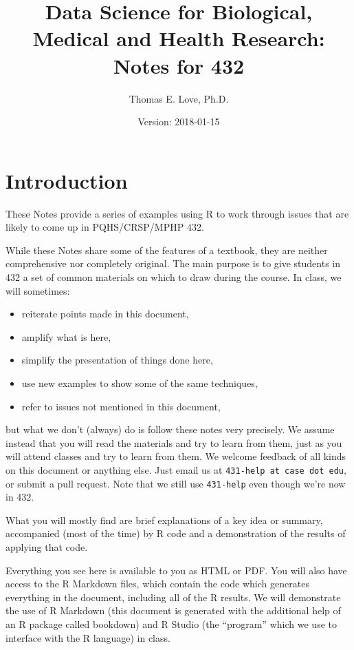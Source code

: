 \documentclass[]{book}
\title{Data Science for Biological, Medical and Health Research: Notes for 432}
\author{Thomas E. Love, Ph.D.}
\date{Version: 2018-01-15}
\providecommand{\tightlist}{%
  \setlength{\itemsep}{0pt}\setlength{\parskip}{0pt}}
\theoremstyle{definition}
\theoremstyle{definition}
\theoremstyle{definition}
\theoremstyle{remark}
\begin{document}
\maketitle

{
\setcounter{tocdepth}{1}
\tableofcontents
}
\chapter*{Introduction}\label{introduction}

These Notes provide a series of examples using R to work through issues
that are likely to come up in PQHS/CRSP/MPHP 432.

While these Notes share some of the features of a textbook, they are
neither comprehensive nor completely original. The main purpose is to
give students in 432 a set of common materials on which to draw during
the course. In class, we will sometimes:

\begin{itemize}
\tightlist
\item
  reiterate points made in this document,
\item
  amplify what is here,
\item
  simplify the presentation of things done here,
\item
  use new examples to show some of the same techniques,
\item
  refer to issues not mentioned in this document,
\end{itemize}

but what we don't (always) do is follow these notes very precisely. We
assume instead that you will read the materials and try to learn from
them, just as you will attend classes and try to learn from them. We
welcome feedback of all kinds on this document or anything else. Just
email us at \texttt{431-help\ at\ case\ dot\ edu}, or submit a pull
request. Note that we still use \texttt{431-help} even though we're now
in 432.

What you will mostly find are brief explanations of a key idea or
summary, accompanied (most of the time) by R code and a demonstration of
the results of applying that code.

Everything you see here is available to you as HTML or PDF. You will
also have access to the R Markdown files, which contain the code which
generates everything in the document, including all of the R results. We
will demonstrate the use of R Markdown (this document is generated with
the additional help of an R package called bookdown) and R Studio (the
``program'' which we use to interface with the R language) in class.
\end{document}
